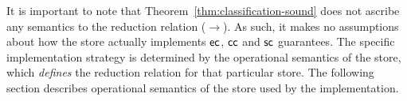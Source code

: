 It is important to note that Theorem~\ref{thm:classification-sound}
does not ascribe any semantics to the reduction relation
($\xrightarrow{}$). As such, it makes no assumptions about how the
store actually implements ${\sf ec}$, ${\sf cc}$ and ${\sf sc}$
guarantees. The specific implementation strategy is determined by the
operational semantics of the store, which \emph{defines} the reduction
relation for that particular store. The following section describes
operational semantics of the store used by the \name implementation.
